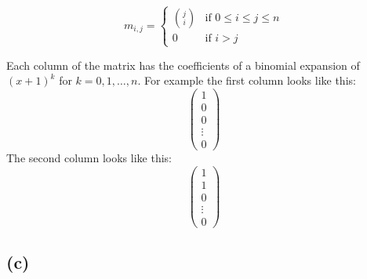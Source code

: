 \documentclass{article}
\begin{document}
\[
   m_{i,j} =
      \begin{cases}
         \binom{j}{i} & \text{if } 0 \leq i \leq j \leq n \\
         0            & \text{if } i > j
      \end{cases}
\]

Each column of the matrix has the coefficients of a binomial expansion of \( (x + 1)^k \) for \( k = 0, 1, \ldots, n \).
For example the first column looks like this:
\[
   \begin{pmatrix}
      1 \\
      0 \\
      0 \\
      \vdots \\
      0
   \end{pmatrix}
\]
The second column looks like this:
\[
   \begin{pmatrix}
      1 \\
      1 \\
      0 \\
      \vdots \\
      0
   \end{pmatrix}
\]

\subsection*{(c)}
\end{document}
